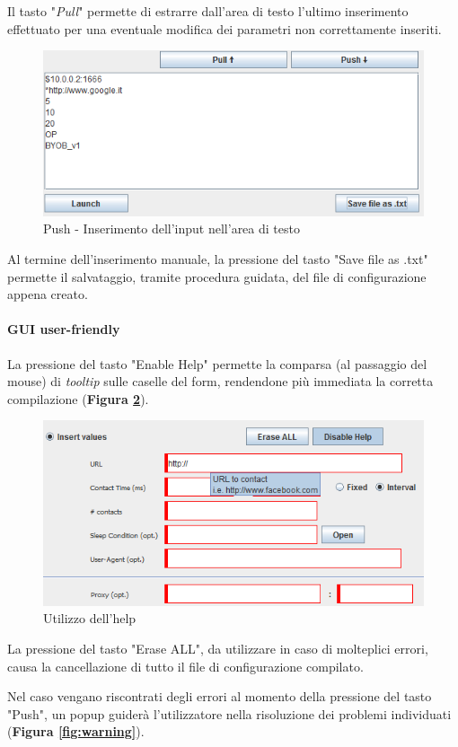 Il tasto "\textit{Pull}" permette di estrarre dall'area di testo l'ultimo inserimento effettuato per una eventuale modifica dei parametri non correttamente inseriti.
\begin{figure}[!htb]
        \centering
		\includegraphics[width=0.6\linewidth]{./imgs/textarea}
        \caption{Push - Inserimento dell'input nell'area di testo}
        \label{fig:push}
        \vspace*{0.5cm}
\end{figure}

Al termine dell'inserimento manuale, la pressione del tasto "Save file as .txt" permette il salvataggio, tramite procedura guidata, del file di configurazione appena creato.

\paragraph{GUI user-friendly}
La pressione del tasto "Enable Help" permette la comparsa (al passaggio del mouse) di \textit{tooltip} sulle caselle del form, rendendone pi\`{u} immediata la corretta compilazione (\textbf{Figura \ref{fig:help}}).

\begin{figure}[!htb]
        \centering        
        \includegraphics[width=0.7\linewidth]{./imgs/help}
        \caption{Utilizzo dell'help}
        \label{fig:help}
\end{figure}

La pressione del tasto "Erase ALL", da utilizzare in caso di molteplici errori, causa la cancellazione di tutto il file di configurazione compilato.

Nel caso vengano riscontrati degli errori al momento della pressione del tasto "Push", un popup guider\`{a} l'utilizzatore nella risoluzione dei problemi individuati (\textbf{Figura \ref{fig:warning}}).


